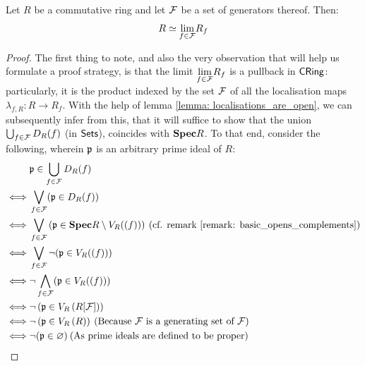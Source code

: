                     \begin{lemma} \label{lemma: limits_indexed_by_generators}
                        Let $R$ be a commutative ring and let $\calF$ be a set of generators thereof. Then:
                            $$R \cong \underset{f \in \calF}{\lim} R_f$$
                    \end{lemma}
                        \begin{proof}
                            The first thing to note, and also the very observation that will help us formulate a proof strategy, is that the limit $\underset{f \in \calF}{\lim} R_f$ is a pullback in $\Cring$: particularly, it is the product indexed by the set $\calF$ of all the localisation maps $\lambda_{f, R}: R \to R_f$. With the help of lemma \ref{lemma: localisations_are_open}, we can subsequently infer from this, that it will suffice to show that the union $\bigcup_{f \in \calF} D_R(f)$ (in $\Sets$), coincides with $\Spec R$. To that end, consider the following, wherein $\p$ is an arbitrary prime ideal of $R$:
                                $$
                                    \begin{aligned}
                                        & \p \in \bigcup_{f \in \calF} D_R(f)
                                        \\
                                        \iff & \bigvee_{f \in \calF} (\p \in D_R(f))
                                        \\
                                        \iff & \bigvee_{f \in \calF} \left(\p \in \Spec R \setminus V_R((f))\right) \: \text{(cf. remark \ref{remark: basic_opens_complements})}
                                        \\
                                        \iff & \bigvee_{f \in \calF} \neg(\p \in V_R((f)))
                                        \\
                                        \iff & \neg \bigwedge_{f \in \calF} (\p \in V_R((f)))
                                        \\
                                        \iff & \neg\left( \p \in V_R\left(R[\calF]\right) \right)
                                        \\
                                        \iff & \neg\left( \p \in V_R\left(R\right) \right) \: \text{(Because $\calF$ is a generating set of $\calF$)}
                                        \\
                                        \iff & \neg(\p \in \varnothing) \: \text{(As prime ideals are defined to be proper)}

\end{aligned}$$
\end{proof}
